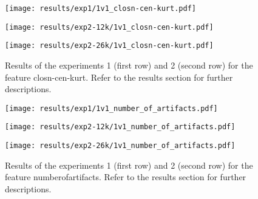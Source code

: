 \begin{figure}[h!]
	\centering
	\begin{minipage}{0.4\linewidth}
		\texttt{[image: results/exp1/1v1\_closn-cen-kurt.pdf]}
	\end{minipage}
	
	\begin{minipage}{0.4\linewidth}
		\texttt{[image: results/exp2-12k/1v1\_closn-cen-kurt.pdf]}
	\end{minipage}
	\begin{minipage}{0.4\linewidth}
		\texttt{[image: results/exp2-26k/1v1\_closn-cen-kurt.pdf]}
	\end{minipage}
	
	\caption[ Results: Feature closn-cen-kurt]{ Results of the experiments 1 (first row) and 2 (second row) for the feature closn-cen-kurt. Refer to the results section for further descriptions. }
	\label{fig:appendix_closn-cen-kurt}
\end{figure}

\begin{figure}[h!]
	\centering
	\begin{minipage}{0.4\linewidth}
		\texttt{[image: results/exp1/1v1\_number\_of\_artifacts.pdf]}
	\end{minipage}
	
	\begin{minipage}{0.4\linewidth}
		\texttt{[image: results/exp2-12k/1v1\_number\_of\_artifacts.pdf]}
	\end{minipage}
	\begin{minipage}{0.4\linewidth}
		\texttt{[image: results/exp2-26k/1v1\_number\_of\_artifacts.pdf]}
	\end{minipage}
	
	\caption[ Results: Feature number\textunderscore of\textunderscore artifacts]{ Results of the experiments 1 (first row) and 2 (second row) for the feature number\textunderscore of\textunderscore artifacts. Refer to the results section for further descriptions. }
	\label{fig:appendix_number_of_artifacts}
\end{figure}
\newpage 


